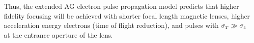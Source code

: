 
Thus, the extended AG electron pulse propagation model predicts that higher fidelity focusing will be achieved with shorter focal length magnetic lenses, higher acceleration energy electrons (time of flight reduction), and pulses with $ \sigma_{ {\scriptscriptstyle T} } \gg \sigma_{ z } $ at the entrance aperture of the lens.

